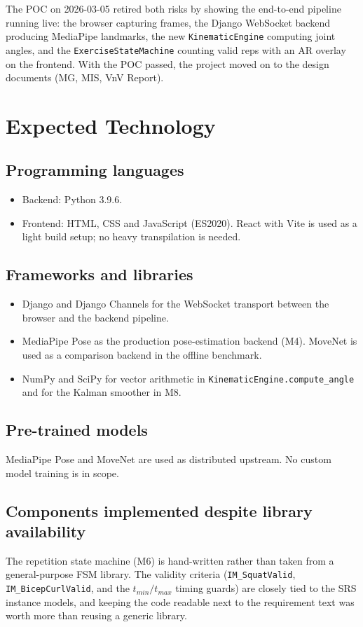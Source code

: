 \documentclass{article}
\begin{document}
The POC on 2026-03-05 retired both risks by showing the end-to-end
pipeline running live: the browser capturing frames, the Django
WebSocket backend producing MediaPipe landmarks, the new
\texttt{KinematicEngine} computing joint angles, and the
\texttt{ExerciseStateMachine} counting valid reps with an AR overlay
on the frontend. With the POC passed, the project moved on to the
design documents (MG, MIS, VnV Report).

\section{Expected Technology}

\subsection*{Programming languages}
\begin{itemize}
  \item Backend: Python 3.9.6.
  \item Frontend: HTML, CSS and JavaScript (ES2020). React with Vite
    is used as a light build setup; no heavy transpilation is needed.
\end{itemize}

\subsection*{Frameworks and libraries}
\begin{itemize}
  \item Django and Django Channels for the WebSocket transport between
    the browser and the backend pipeline.
  \item MediaPipe Pose as the production pose-estimation backend (M4).
    MoveNet is used as a comparison backend in the offline benchmark.
  \item NumPy and SciPy for vector arithmetic in
    \texttt{KinematicEngine.compute\_angle} and for the Kalman
    smoother in M8.
\end{itemize}

\subsection*{Pre-trained models}
MediaPipe Pose and MoveNet are used as distributed upstream. No
custom model training is in scope.

\subsection*{Components implemented despite library availability}
The repetition state machine (M6) is hand-written rather than taken
from a general-purpose FSM library. The validity criteria
(\texttt{IM\_SquatValid}, \texttt{IM\_BicepCurlValid}, and the
$t_{min}/t_{max}$ timing guards) are closely tied to the SRS instance
models, and keeping the code readable next to the requirement text
was worth more than reusing a generic library.
\end{document}
